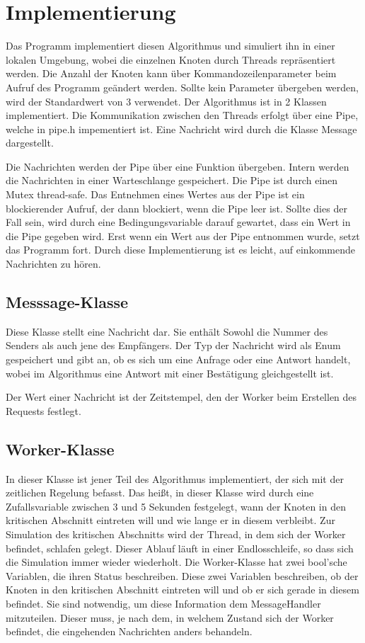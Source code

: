 \documentclass{article}
\begin{document}
\section{Implementierung}
Das Programm implementiert diesen Algorithmus und simuliert ihn in einer lokalen Umgebung, wobei die einzelnen Knoten durch Threads repräsentiert werden. Die Anzahl der Knoten kann über Kommandozeilenparameter beim Aufruf des Programm geändert werden. Sollte kein Parameter übergeben werden, wird der Standardwert von 3 verwendet. Der Algorithmus ist in 2 Klassen implementiert. Die Kommunikation zwischen den Threads erfolgt über eine Pipe, welche in pipe.h impementiert ist. Eine Nachricht wird durch die Klasse Message dargestellt.

Die Nachrichten werden der Pipe über eine Funktion übergeben. Intern werden die Nachrichten in einer Warteschlange gespeichert. Die Pipe ist durch einen Mutex thread-safe. Das Entnehmen eines Wertes aus der Pipe ist ein blockierender Aufruf, der dann blockiert, wenn die Pipe leer ist. Sollte dies der Fall sein, wird durch eine Bedingungsvariable darauf gewartet, dass ein Wert in die Pipe gegeben wird. Erst wenn ein Wert aus der Pipe entnommen wurde, setzt das Programm fort. Durch diese Implementierung ist es leicht, auf einkommende Nachrichten zu hören.

\subsection{Messsage-Klasse}
Diese Klasse stellt eine Nachricht dar. Sie enthält Sowohl die Nummer des Senders als auch jene des Empfängers. Der Typ der Nachricht wird als Enum gespeichert und gibt an, ob es sich um eine Anfrage oder eine Antwort handelt, wobei im Algorithmus eine Antwort mit einer Bestätigung gleichgestellt ist.

Der Wert einer Nachricht ist der Zeitstempel, den der Worker beim Erstellen des Requests festlegt.

\subsection{Worker-Klasse}
In dieser Klasse ist jener Teil des Algorithmus implementiert, der sich mit der zeitlichen Regelung befasst. Das heißt, in dieser Klasse wird durch eine Zufallsvariable zwischen 3 und 5 Sekunden festgelegt, wann der Knoten in den kritischen Abschnitt eintreten will und wie lange er in diesem verbleibt. Zur Simulation des kritischen Abschnitts wird der Thread, in dem sich der Worker befindet, schlafen gelegt. Dieser Ablauf läuft in einer Endlosschleife, so dass sich die Simulation immer wieder wiederholt. Die Worker-Klasse hat zwei bool'sche Variablen, die ihren Status beschreiben. Diese zwei Variablen beschreiben, ob der Knoten in den kritischen Abschnitt eintreten will und ob er sich gerade in diesem befindet. Sie sind notwendig, um diese Information dem MessageHandler mitzuteilen. Dieser muss, je nach dem, in welchem Zustand sich der Worker befindet, die eingehenden Nachrichten anders behandeln.
\end{document}
